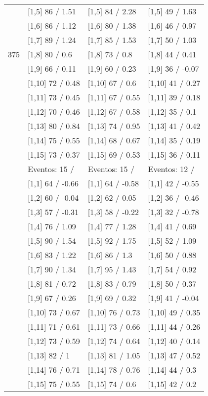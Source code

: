 \begin{table}
\begin{tabular}[t]{llll}
 & {}[1,5] 86  / 1.51 & {}[1,5] 84  / 2.28 & {}[1,5] 49  / 1.63\\
 & {}[1,6] 86  / 1.12 & {}[1,6] 80  / 1.38 & {}[1,6] 46  / 0.97\\
 & {}[1,7] 89  / 1.24 & {}[1,7] 85  / 1.53 & {}[1,7] 50  / 1.03\\
375 & {}[1,8] 80  / 0.6 & {}[1,8] 73  / 0.8 & {}[1,8] 44  / 0.41\\
\addlinespace
 & {}[1,9] 66  / 0.11 & {}[1,9] 60  / 0.23 & {}[1,9] 36  / -0.07\\
 & {}[1,10] 72  / 0.48 & {}[1,10] 67  / 0.6 & {}[1,10] 41  / 0.27\\
 & {}[1,11] 73  / 0.45 & {}[1,11] 67  / 0.55 & {}[1,11] 39  / 0.18\\
 & {}[1,12] 70  / 0.46 & {}[1,12] 67  / 0.58 & {}[1,12] 35  / 0.1\\
 & {}[1,13] 80  / 0.84 & {}[1,13] 74  / 0.95 & {}[1,13] 41  / 0.42\\
\addlinespace
 & {}[1,14] 75  / 0.55 & {}[1,14] 68  / 0.67 & {}[1,14] 35  / 0.19\\
 & {}[1,15] 73  / 0.37 & {}[1,15] 69  / 0.53 & {}[1,15] 36  / 0.11\\
 & Eventos:  15 / & Eventos:  15 / & Eventos:  12 /\\
 & {}[1,1] 64  / -0.66 & {}[1,1] 64  / -0.58 & {}[1,1] 42  / -0.55\\
 & {}[1,2] 60  / -0.04 & {}[1,2] 62  / 0.05 & {}[1,2] 36  / -0.46\\
\addlinespace
 & {}[1,3] 57  / -0.31 & {}[1,3] 58  / -0.22 & {}[1,3] 32  / -0.78\\
 & {}[1,4] 76  / 1.09 & {}[1,4] 77  / 1.28 & {}[1,4] 41  / 0.69\\
 & {}[1,5] 90  / 1.54 & {}[1,5] 92  / 1.75 & {}[1,5] 52  / 1.09\\
 & {}[1,6] 83  / 1.22 & {}[1,6] 86  / 1.3 & {}[1,6] 50  / 0.88\\
 & {}[1,7] 90  / 1.34 & {}[1,7] 95  / 1.43 & {}[1,7] 54  / 0.92\\
\addlinespace
500 & {}[1,8] 81  / 0.72 & {}[1,8] 83  / 0.79 & {}[1,8] 50  / 0.37\\
 & {}[1,9] 67  / 0.26 & {}[1,9] 69  / 0.32 & {}[1,9] 41  / -0.04\\
 & {}[1,10] 73  / 0.67 & {}[1,10] 76  / 0.73 & {}[1,10] 49  / 0.35\\
 & {}[1,11] 71  / 0.61 & {}[1,11] 73  / 0.66 & {}[1,11] 44  / 0.26\\
 & {}[1,12] 73  / 0.59 & {}[1,12] 74  / 0.64 & {}[1,12] 40  / 0.14\\
\addlinespace
 & {}[1,13] 82  / 1 & {}[1,13] 81  / 1.05 & {}[1,13] 47  / 0.52\\
 & {}[1,14] 76  / 0.71 & {}[1,14] 78  / 0.76 & {}[1,14] 44  / 0.3\\
 & {}[1,15] 75  / 0.55 & {}[1,15] 74  / 0.6 & {}[1,15] 42  / 0.2\\
\bottomrule
\end{tabular}
\end{table}
